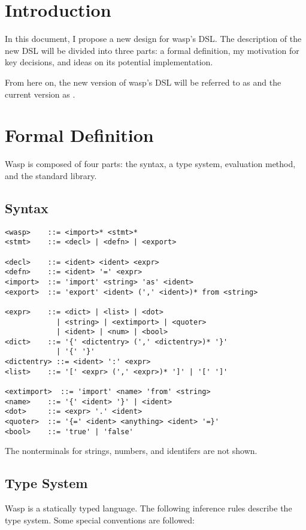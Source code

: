 \section{Introduction}

In this document, I propose a new design for wasp's DSL. The description
of the new DSL will be divided into three parts: a formal definition, my
motivation for key decisions, and ideas on its potential implementation.

From here on, the new version of wasp's DSL will be referred to as 
and the current version as .

\section{Formal Definition}

Wasp is composed of four parts: the syntax, a type system, evaluation method,
and the standard library.

\subsection{Syntax}

\begin{verbatim}
<wasp>    ::= <import>* <stmt>*
<stmt>    ::= <decl> | <defn> | <export>

<decl>    ::= <ident> <ident> <expr>
<defn>    ::= <ident> '=' <expr>
<import>  ::= 'import' <string> 'as' <ident>
<export>  ::= 'export' <ident> (',' <ident>)* from <string>

<expr>    ::= <dict> | <list> | <dot>
            | <string> | <extimport> | <quoter>
            | <ident> | <num> | <bool>
<dict>    ::= '{' <dictentry> (',' <dictentry>)* '}'
            | '{' '}'
<dictentry> ::= <ident> ':' <expr>
<list>    ::= '[' <expr> (',' <expr>)* ']' | '[' ']'

<extimport>  ::= 'import' <name> 'from' <string>
<name>    ::= '{' <ident> '}' | <ident>
<dot>     ::= <expr> '.' <ident>
<quoter>  ::= '{=' <ident> <anything> <ident> '=}'
<bool>    ::= 'true' | 'false'
\end{verbatim}

The nonterminals for strings, numbers, and identifers are not shown.

\subsection{Type System}

Wasp is a statically typed language. The following inference rules describe the
type system. Some special conventions are followed:

